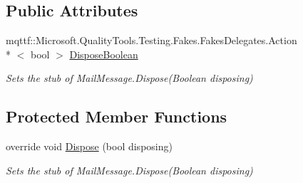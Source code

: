 \subsection*{Public Attributes}
\begin{DoxyCompactItemize}
\item 
mqttf\-::\-Microsoft.\-Quality\-Tools.\-Testing.\-Fakes.\-Fakes\-Delegates.\-Action\\*
$<$ bool $>$ \hyperlink{class_system_1_1_net_1_1_mail_1_1_fakes_1_1_stub_mail_message_ab6f6779cb65d8608bc79f2cd2eec1466}{Dispose\-Boolean}
\begin{DoxyCompactList}\small\item\em Sets the stub of Mail\-Message.\-Dispose(\-Boolean disposing)\end{DoxyCompactList}\end{DoxyCompactItemize}
\subsection*{Protected Member Functions}
\begin{DoxyCompactItemize}
\item 
override void \hyperlink{class_system_1_1_net_1_1_mail_1_1_fakes_1_1_stub_mail_message_a8357e9abd21439742c8eeed299e1e4bd}{Dispose} (bool disposing)
\begin{DoxyCompactList}\small\item\em Sets the stub of Mail\-Message.\-Dispose(\-Boolean disposing)\end{DoxyCompactList}\end{DoxyCompactItemize}
